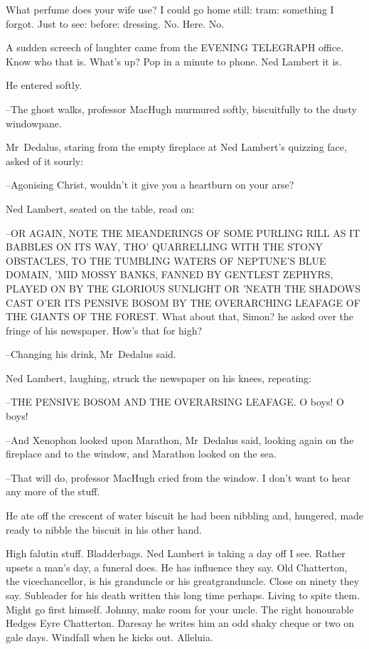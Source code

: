What perfume does your wife use?
I could go home still:
tram: something I forgot.
Just to see: before:
dressing.
No.
Here.
No.

A sudden screech of laughter came from the EVENING TELEGRAPH office.
Know who that is.
What's up?
Pop in a minute to phone.
Ned Lambert it is.

He entered softly.



--The ghost walks,
professor MacHugh murmured softly, biscuitfully
to the dusty windowpane.

Mr~Dedalus,
staring from the empty fireplace at Ned Lambert's quizzing face,
asked of it sourly:

--Agonising Christ,
wouldn't it give you a heartburn on your arse?

Ned Lambert, seated on the table, read on:

--OR AGAIN, NOTE THE MEANDERINGS OF SOME PURLING RILL
AS IT BABBLES ON ITS WAY,
THO' QUARRELLING WITH THE STONY OBSTACLES,
TO THE TUMBLING WATERS OF NEPTUNE'S BLUE DOMAIN,
'MID MOSSY BANKS,
FANNED BY GENTLEST ZEPHYRS,
PLAYED ON BY THE GLORIOUS SUNLIGHT
OR 'NEATH THE SHADOWS CAST O'ER ITS PENSIVE BOSOM
BY THE OVERARCHING LEAFAGE OF THE GIANTS OF THE FOREST.
What about that, Simon?
he asked over the fringe of his newspaper.
How's that for high?

--Changing his drink,
Mr~Dedalus said.

Ned Lambert, laughing,
struck the newspaper on his knees,
repeating:

--THE PENSIVE BOSOM AND THE OVERARSING LEAFAGE.
O boys!
O boys!

--And Xenophon looked upon Marathon,
Mr~Dedalus said,
looking again on the fireplace and to the window,
and Marathon looked on the sea.

--That will do,
professor MacHugh cried from the window.
I don't want to hear any more of the stuff.

He ate off the crescent of water biscuit
he had been nibbling and,
hungered,
made ready to nibble the biscuit in his other hand.

High falutin stuff.
Bladderbags.
Ned Lambert is taking a day off I see.
Rather upsets a man's day, a funeral does.
He has influence they say.
Old Chatterton, the vicechancellor, is his granduncle or his greatgranduncle.
Close on ninety they say.
Subleader for his death written this long time perhaps.
Living to spite them.
Might go first himself.
Johnny, make room for your uncle.
The right honourable Hedges Eyre Chatterton.
Daresay he writes him an odd shaky cheque or two on gale days.
Windfall when he kicks out. Alleluia.

